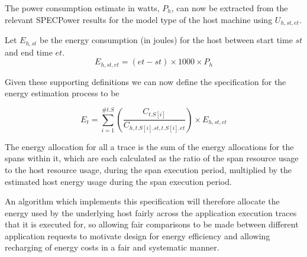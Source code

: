 The power consumption estimate in watts, $P_{h}$, can now be extracted from the relevant SPECPower results for the model type of the host machine using $U_{h,st,et}$.

Let $E_{h,st}$ be the energy consumption (in joules) for the host between start time $st$ and end time $et$.
\begin{equation}
E_{h,st,et} = (et - st) \times 1000 \times P_{h}
\end{equation}


Given these supporting definitions we can now define the specification for the energy estimation process to be

\begin{equation}
E_{t} = \sum_{i=1}^{\#t.S} ( \frac {C_{t.S[i]}} {C_{h,t.S[i].st,t.S[i].et}} ) \times E_{h, st, et}
\end{equation}

The energy allocation for all a trace is the sum of the energy allocations for the spans within it, which are each calculated as the ratio of the span resource usage to the host resource usage, during the span execution period, multiplied by the estimated host energy usage during the span execution period.

An algorithm which implements this specification will therefore allocate the energy used by the underlying host fairly across the application execution traces that it is executed for, so allowing fair comparisons to be made between different application requests to motivate design for energy efficiency and allowing recharging of energy costs in a fair and systematic manner.












